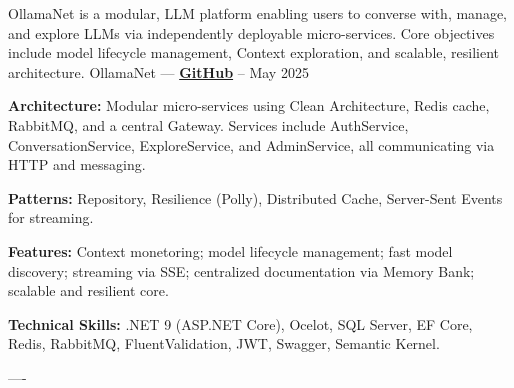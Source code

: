 

\begin{cventries}

\cventry
    {OllamaNet is a modular, LLM platform enabling users to converse with, manage, and explore LLMs
    via independently deployable micro-services.
    Core objectives include model lifecycle management, Context exploration, and scalable, resilient architecture.}
    {OllamaNet — \href{https://github.com/ollamaNet/OllamaNet-Architecture}{\color{midnightblue}\textbf{GitHub}} \textrm{\faArrowRight}}
    {--}
    {May 2025}
    {
      \begin{cvitems}
        \item \textbf{Architecture:}{ Modular micro-services using Clean Architecture, Redis cache, RabbitMQ, and a central Gateway.
                                      Services include AuthService, ConversationService, ExploreService, and AdminService, 
                                      all communicating via HTTP and messaging.}
        \item \textbf{Patterns:}{ Repository, Resilience (Polly), Distributed Cache, Server-Sent Events for streaming.}
        \item \textbf{Features:}{ Context monetoring; model lifecycle management; fast model discovery; streaming via SSE; centralized documentation via Memory Bank; scalable and resilient core.}
        \item \textbf{Technical Skills:}{ .NET 9 (ASP.NET Core), Ocelot, SQL Server, EF Core, Redis, RabbitMQ, FluentValidation, JWT, Swagger, Semantic Kernel.}
      \end{cvitems}
    }
    \begin{singlespace}
----
\end{singlespace}



\end{cventries}
